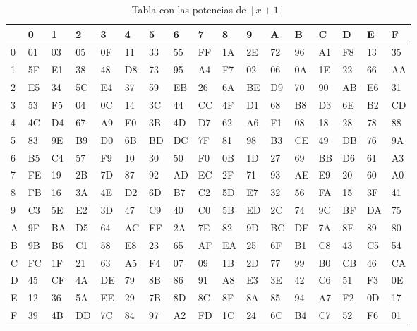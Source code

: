 \begin{table}[!htb]
    \begin{adjustwidth}{-.8in}{-.8in}  
\begin{tabular}{|l|l|l|l|l|l|l|l|l|l|l|l|l|l|l|l|l|}
\hline
\multicolumn{1}{|r|}{} & 0  & 1  & 2  & 3  & 4  & 5  & 6  & 7  & 8  & 9  & A  & B  & C  & D  & E  & F  \\ \hline
0                      & 01 & 03 & 05 & 0F & 11 & 33 & 55 & FF & 1A & 2E & 72 & 96 & A1 & F8 & 13 & 35 \\ \hline
1                      & 5F & E1 & 38 & 48 & D8 & 73 & 95 & A4 & F7 & 02 & 06 & 0A & 1E & 22 & 66 & AA \\ \hline
2                      & E5 & 34 & 5C & E4 & 37 & 59 & EB & 26 & 6A & BE & D9 & 70 & 90 & AB & E6 & 31 \\ \hline
3                      & 53 & F5 & 04 & 0C & 14 & 3C & 44 & CC & 4F & D1 & 68 & B8 & D3 & 6E & B2 & CD \\ \hline
4                      & 4C & D4 & 67 & A9 & E0 & 3B & 4D & D7 & 62 & A6 & F1 & 08 & 18 & 28 & 78 & 88 \\ \hline
5                      & 83 & 9E & B9 & D0 & 6B & BD & DC & 7F & 81 & 98 & B3 & CE & 49 & DB & 76 & 9A \\ \hline
6                      & B5 & C4 & 57 & F9 & 10 & 30 & 50 & F0 & 0B & 1D & 27 & 69 & BB & D6 & 61 & A3 \\ \hline
7                      & FE & 19 & 2B & 7D & 87 & 92 & AD & EC & 2F & 71 & 93 & AE & E9 & 20 & 60 & A0 \\ \hline
8                      & FB & 16 & 3A & 4E & D2 & 6D & B7 & C2 & 5D & E7 & 32 & 56 & FA & 15 & 3F & 41 \\ \hline
9                      & C3 & 5E & E2 & 3D & 47 & C9 & 40 & C0 & 5B & ED & 2C & 74 & 9C & BF & DA & 75 \\ \hline
A                      & 9F & BA & D5 & 64 & AC & EF & 2A & 7E & 82 & 9D & BC & DF & 7A & 8E & 89 & 80 \\ \hline
B                      & 9B & B6 & C1 & 58 & E8 & 23 & 65 & AF & EA & 25 & 6F & B1 & C8 & 43 & C5 & 54 \\ \hline
C                      & FC & 1F & 21 & 63 & A5 & F4 & 07 & 09 & 1B & 2D & 77 & 99 & B0 & CB & 46 & CA \\ \hline
D                      & 45 & CF & 4A & DE & 79 & 8B & 86 & 91 & A8 & E3 & 3E & 42 & C6 & 51 & F3 & 0E \\ \hline
E                      & 12 & 36 & 5A & EE & 29 & 7B & 8D & 8C & 8F & 8A & 85 & 94 & A7 & F2 & 0D & 17 \\ \hline
F                      & 39 & 4B & DD & 7C & 84 & 97 & A2 & FD & 1C & 24 & 6C & B4 & C7 & 52 & F6 & 01 \\ \hline
\end{tabular}
	\label{potencias}
	\end{adjustwidth}
\caption{Tabla con las potencias de $[x+1]$}
\end{table}
